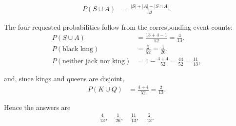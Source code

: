 \begin{enumerate}[label=\thesubsection.\arabic*, ref=\thesubsection.\theenumi]
    \par
    \begin{align*}
        P(S\cup A) & =\frac{|S|+|A|-|S\cap A|}{52}.
    \end{align*}

    The four requested probabilities follow from the corresponding event counts:
    \begin{align*}
        P(S\cup A)                      & =\frac{13+4-1}{52}=\frac4{13}.                 \\
        P(\text{black king})            & =\frac2{52}=\frac1{26}.                        \\
        P(\text{neither jack nor king}) & =1-\frac{4+4}{52}=\frac{44}{52}=\frac{11}{13},
    \end{align*}

    and, since kings and queens are disjoint,
    \begin{align*}
        P(K\cup Q) & =\frac{4+4}{52}=\frac2{13}.
    \end{align*}

    Hence the answers are
    \begin{align*}
        \frac4{13},\quad \frac1{26},\quad \frac{11}{13},\quad \frac2{13}.
    \end{align*}


\end{enumerate}
